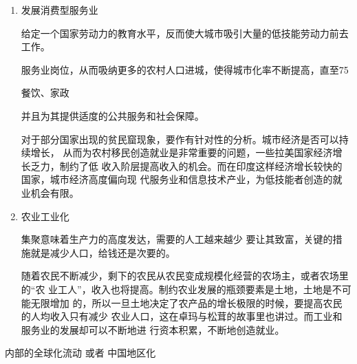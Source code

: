 \begin{enumerate}
\item 发展消费型服务业

  给定一个国家劳动力的教育水平，反而使大城市吸引大量的低技能劳动力前去工作。


  服务业岗位，从而吸纳更多的农村人口进城，使得城市化率不断提高，直至75%

  餐饮、家政


  并且为其提供适度的公共服务和社会保障。

  对于部分国家出现的贫民窟现象，要作有针对性的分析。城市经济是否可以持续增长，
  从而为农村移民创造就业是非常重要的问题，一些拉美国家经济增长乏力，制约了低
  收入阶层提高收入的机会。而在印度这样经济增长较快的国家，城市经济高度偏向现
  代服务业和信息技术产业，为低技能者创造的就业机会有限。


\item 农业工业化

  集聚意味着生产力的高度发达，需要的人工越来越少
  要让其致富，关键的措施就是减少人口，给钱还是次要的。

  随着农民不断减少，剩下的农民从农民变成规模化经营的农场主，或者农场里的“农
  业工人”，收入也将提高。制约农业发展的瓶颈要素是土地，土地是不可能无限增加
  的，所以一旦土地决定了农产品的增长极限的时候，要提高农民的人均收入只有减少
  农业人口，这在卓玛与松茸的故事里也讲过。而工业和服务业的发展却可以不断地进
  行资本积累，不断地创造就业。

\end{enumerate}



内部的全球化流动 或者 中国地区化










